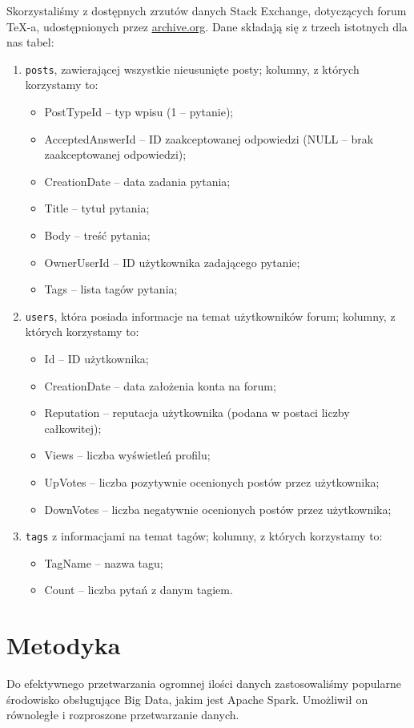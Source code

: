 \documentclass[12pt]{article}
\begin{document}
	Skorzystaliśmy z dostępnych zrzutów danych Stack Exchange, dotyczących forum \TeX-a, udostępnionych przez \underline{\href{https://archive.org/details/stackexchange}{archive.org}}. Dane składają się z trzech istotnych dla nas tabel:
	\begin{enumerate}
		\item \verb|posts|, zawierającej wszystkie nieusunięte posty; kolumny, z których korzystamy to:
		\begin{itemize}
			\item PostTypeId -- typ wpisu (1 -- pytanie);
			\item AcceptedAnswerId -- ID zaakceptowanej odpowiedzi (NULL -- brak zaakceptowanej odpowiedzi); 
			\item CreationDate -- data zadania pytania;
			\item Title -- tytuł pytania;
			\item Body -- treść pytania;
			\item OwnerUserId -- ID użytkownika zadającego pytanie;
			\item Tags -- lista tagów pytania;
		\end{itemize}
		\item \verb|users|, która posiada informacje na temat użytkowników forum; kolumny, z których korzystamy to:
		\begin{itemize}
			\item Id -- ID użytkownika;
			\item CreationDate -- data założenia konta na forum;
			\item Reputation -- reputacja użytkownika (podana w postaci liczby całkowitej);
			\item Views -- liczba wyświetleń profilu;
			\item UpVotes -- liczba pozytywnie ocenionych postów przez użytkownika;
			\item DownVotes -- liczba negatywnie ocenionych postów przez użytkownika;
		\end{itemize}
		\item \verb|tags| z informacjami na temat tagów; kolumny, z których korzystamy to:
		\begin{itemize}
			\item TagName -- nazwa tagu;
			\item Count -- liczba pytań z danym tagiem.
		\end{itemize}
	\end{enumerate}
	
	\section{Metodyka}\label{sec:metodyka}
	Do efektywnego przetwarzania ogromnej ilości danych zastosowaliśmy popularne środowisko obsługujące Big Data, jakim jest Apache Spark. Umożliwił on równoległe i rozproszone przetwarzanie danych.
	
\end{document}
